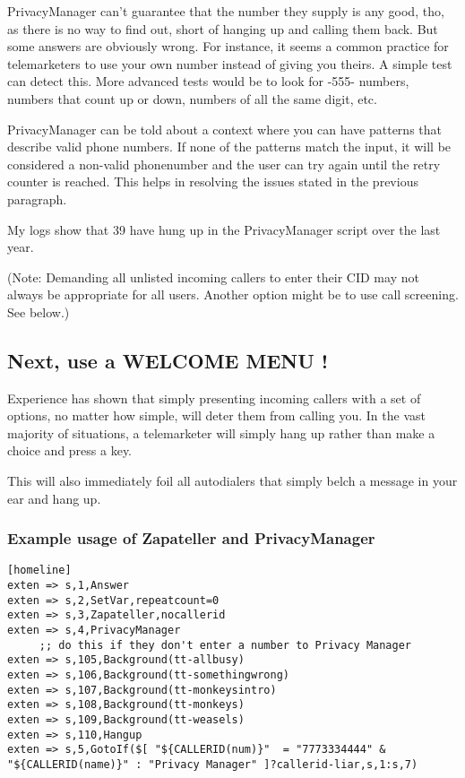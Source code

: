 PrivacyManager can't guarantee that the number they supply is any
good, tho, as there is no way to find out, short of hanging up and
calling them back. But some answers are obviously wrong. For instance,
it seems a common practice for telemarketers to use your own number
instead of giving you theirs. A simple test can detect this. More
advanced tests would be to look for -555- numbers, numbers that count
up or down, numbers of all the same digit, etc.

PrivacyManager can be told about a context where you can have patterns
that describe valid phone numbers. If none of the patterns match the
input, it will be considered a non-valid phonenumber and the user
can try again until the retry counter is reached.
This helps in resolving the issues stated in the previous paragraph.

My logs show that 39 have hung up in the PrivacyManager script over
the last year.

(Note: Demanding all unlisted incoming callers to enter their CID may
not always be appropriate for all users. Another option might be to
use call screening. See below.)


\subsection{Next, use a WELCOME MENU !}

Experience has shown that simply presenting incoming callers with
a set of options, no matter how simple, will deter them from calling
you. In the vast majority of situations, a telemarketer will simply
hang up rather than make a choice and press a key.

This will also immediately foil all autodialers that simply belch a
message in your ear and hang up.

\subsubsection{Example usage of Zapateller and PrivacyManager}

\begin{astlisting}
\begin{verbatim}
[homeline]
exten => s,1,Answer
exten => s,2,SetVar,repeatcount=0
exten => s,3,Zapateller,nocallerid
exten => s,4,PrivacyManager
     ;; do this if they don't enter a number to Privacy Manager
exten => s,105,Background(tt-allbusy)
exten => s,106,Background(tt-somethingwrong)
exten => s,107,Background(tt-monkeysintro)
exten => s,108,Background(tt-monkeys)
exten => s,109,Background(tt-weasels)
exten => s,110,Hangup
exten => s,5,GotoIf($[ "${CALLERID(num)}"  = "7773334444" & "${CALLERID(name)}" : "Privacy Manager" ]?callerid-liar,s,1:s,7)
\end{verbatim}
\end{astlisting}

